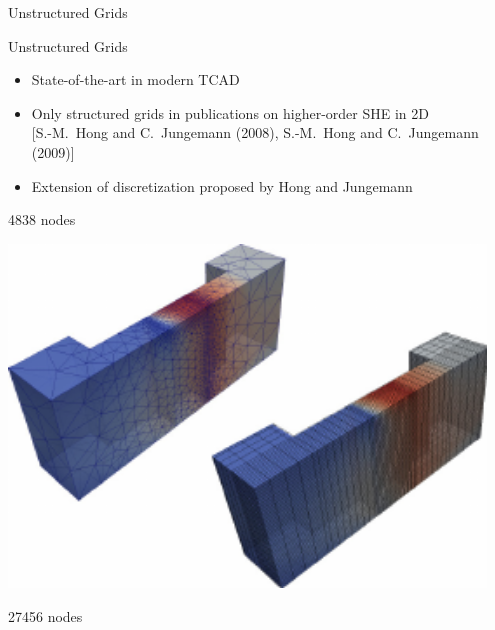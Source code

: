 \documentclass[usepdftitle=false,10pt]{beamer}
\begin{document}
\begin{frame}{Unstructured Grids}
 \begin{block}{Unstructured Grids}
  \begin{itemize}
   \item State-of-the-art in modern TCAD
   \item Only structured grids in publications on higher-order SHE in 2D  \\
         \hspace{0.3cm} {\footnotesize [S.-M.~Hong and C.~Jungemann (2008), S.-M.~Hong and C.~Jungemann (2009)] }
   \item Extension of discretization proposed by Hong and Jungemann
  \end{itemize}
 \end{block}

 \begin{center}
  \begin{minipage}{0.2\textwidth}
    4838 nodes
  \end{minipage}
  \begin{minipage}{0.55\textwidth}
    \includegraphics[width=0.95\textwidth]{tetsortho}\ \ \\
  \end{minipage}
  \begin{minipage}{0.2\textwidth}
    27456 nodes
  \end{minipage}
 \end{center}
\end{frame}



\end{document}
